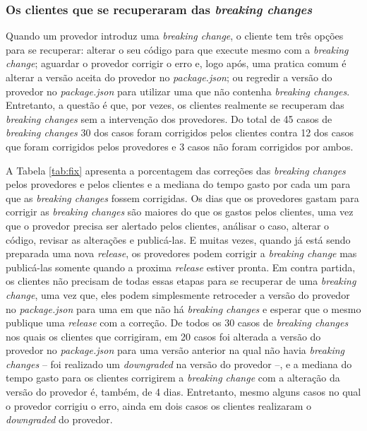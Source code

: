 \subsubsection{Os clientes que se recuperaram das \textit{breaking changes}}
Quando um provedor introduz uma \textit{breaking change}, o cliente tem três opções para se recuperar: alterar o seu código para que execute mesmo com a \textit{breaking change}; aguardar o provedor corrigir o erro e, logo após, uma pratica comum é alterar a versão aceita do provedor no \textit{package.json}; ou regredir a versão do provedor no \textit{package.json} para utilizar uma que não contenha \textit{breaking changes}. Entretanto, a questão é que, por vezes, os clientes realmente se recuperam das \textit{breaking changes} sem a intervenção dos provedores. Do total de 45 casos de \textit{breaking changes} 30 dos casos foram corrigidos pelos clientes contra 12 dos casos que foram corrigidos pelos provedores  e 3 casos não foram corrigidos por ambos.

A Tabela \ref{tab:fix} apresenta a porcentagem das correções das \textit{breaking changes} pelos provedores e pelos clientes e a mediana do tempo gasto por cada um para que as \textit{breaking changes} fossem corrigidas. Os dias que os provedores gastam para corrigir as \textit{breaking changes} são maiores do que os gastos pelos clientes, uma vez que o provedor precisa ser alertado pelos clientes, análisar o caso, alterar o código, revisar as alterações e publicá-las. E muitas vezes, quando já está sendo preparada uma nova \textit{release}, os provedores podem corrigir a \textit{breaking change} mas publicá-las somente quando a proxima \textit{release} estiver pronta. Em contra partida, os clientes não precisam de todas essas etapas para se recuperar de uma \textit{breaking change}, uma vez que, eles podem simplesmente retroceder a versão do provedor no \textit{package.json} para uma em que não há \textit{breaking changes} e esperar que o mesmo publique uma \textit{release} com a correção. De todos os 30 casos de \textit{breaking changes} nos quais os clientes que corrigiram, em 20 casos foi alterada a versão do provedor no \textit{package.json} para uma versão anterior na qual não havia \textit{breaking changes} -- foi realizado um \textit{downgraded} na versão do provedor --, e a mediana do tempo gasto para os clientes corrigirem a \textit{breaking change} com a alteração da versão do provedor é, também, de 4 dias. Entretanto, mesmo alguns casos no qual o provedor corrigiu o erro, ainda em dois casos os clientes realizaram o \textit{downgraded} do provedor.

